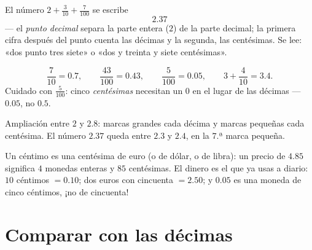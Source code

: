 \begin{definition}\label{def:g4:decimals:point}
El número $2 + \frac{3}{10} + \frac{7}{100}$ se escribe
\[
2.37
\]
--- el \emph{punto decimal} separa la parte entera ($2$) de la
parte decimal; la primera cifra después del punto cuenta las décimas y la
segunda, las centésimas. Se lee: «dos punto tres siete» o «dos
y treinta y siete centésimas».
\end{definition}

\begin{example}\label{ex:g4:decimals:convert}
\[
\frac{7}{10} = 0.7, \qquad
\frac{43}{100} = 0.43, \qquad
\frac{5}{100} = 0.05, \qquad
3 + \frac{4}{10} = 3.4 .
\]
Cuidado con $\frac{5}{100}$: cinco \emph{centésimas} necesitan un $0$ en
el lugar de las décimas --- $0.05$, no $0.5$.
\end{example}

\begin{omfigure}

{\small Ampliación entre $2$ y $2.8$: marcas grandes cada décima y marcas
pequeñas cada centésima. El número $2.37$ queda entre $2.3$ y
$2.4$, en la $7$.ª marca pequeña.}
\end{omfigure}

\begin{example}\label{ex:g4:decimals:money}
Un céntimo es una centésima de euro (o de dólar, o de libra): un precio
de $4.85$ significa $4$ monedas enteras y $85$ centésimas. El dinero es el
 que ya usas a diario: $10$ céntimos $= 0.10$; dos
euros con cincuenta $= 2.50$; y $0.05$ es una moneda de cinco céntimos, ¡no de cincuenta!
\end{example}

\section{Comparar con las décimas}

